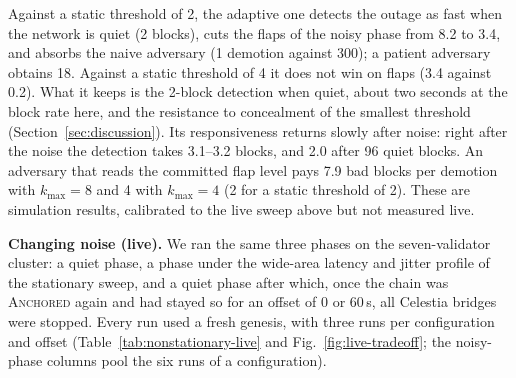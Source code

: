\begin{table}[tbp]
\caption{Static and adaptive down thresholds in the in-process simulation
(blocks; mean $\pm$ 95\% interval over 200 paired noise schedules). ``Detect
after noise'' starts the outage as soon as the chain is \textsc{Anchored}
again. Repeated trigger: demotions in 1200 blocks. Outage hidden: placements
out of 35 of three Byzantine proposers that keep a real DA outage from being
detected, with the chain quiet and with the flap level at its highest.}
\label{tab:adaptive-sim}
\centering
\footnotesize
\resizebox{\linewidth}{!}{}
\end{table}

Against a static threshold of 2, the adaptive one detects the outage as fast
when the network is quiet (2 blocks), cuts the flaps of the noisy phase from 8.2
to 3.4, and absorbs the naive adversary (1 demotion against 300); a patient
adversary obtains 18. Against a static threshold of 4 it does not win on flaps
(3.4 against 0.2). What it keeps is the 2-block detection when quiet, about two
seconds at the block rate here, and the resistance to concealment of the
smallest threshold (Section~\ref{sec:discussion}). Its responsiveness returns
slowly after noise: right after the noise the detection takes 3.1--3.2 blocks,
and 2.0 after 96 quiet blocks. An adversary that reads the committed flap level
pays 7.9 bad blocks per demotion with $k_{\max}{=}8$ and 4 with $k_{\max}{=}4$
(2 for a static threshold of 2). These are simulation results, calibrated to the
live sweep above but not measured live.

\textbf{Changing noise (live).} We ran the same three phases on the seven-validator
cluster: a quiet phase, a phase under the wide-area latency and jitter profile of
the stationary sweep, and a quiet phase after which, once the chain was
\textsc{Anchored} again and had stayed so for an offset of 0 or 60\,s, all
Celestia bridges were stopped. Every run used a fresh genesis, with three runs per
configuration and offset (Table~\ref{tab:nonstationary-live} and
Fig.~\ref{fig:live-tradeoff}; the noisy-phase columns pool the six runs of a
configuration).

\begin{table}[tbp]
\caption{Live three-phase runs: mean (range) over three runs per offset (the noisy
phase pools six). Detection is the time from the bridge stop to the first
non-\textsc{Anchored} state.}
\label{tab:nonstationary-live}
\centering
\scriptsize
\resizebox{\linewidth}{!}{}
\end{table}

